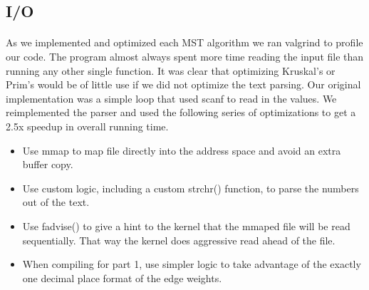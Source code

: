 \subsection{I/O}
\label{sec:deep:io}

\paragraph{}
As we implemented and optimized each MST algorithm we ran valgrind to
profile our code. The program almost always spent more time reading the
input file than running any other single function. It was clear that
optimizing Kruskal's or Prim's would be of little use if we did not
optimize the text parsing. Our original implementation was a simple loop
that used scanf to read in the values. We reimplemented the parser and used
the following series of optimizations
to get a 2.5x speedup in overall running time.
\begin{itemize}
\item
Use mmap to map file directly into the address space and avoid an extra
buffer copy.
\item
Use custom logic, including a custom strchr() function, to parse the
numbers out of the text.
\item
Use fadvise() to give a hint to the kernel that the mmaped file will be
read sequentially. That way the kernel does aggressive read ahead of the
file.
\item
When compiling for part 1, use simpler logic to take advantage of the exactly
one decimal place format of the edge weights.
\end{itemize}
